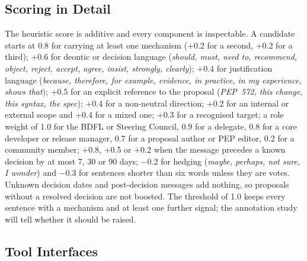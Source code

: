 \subsection{Scoring in Detail}

The heuristic score is additive and every component is inspectable. A candidate starts at 0.8 for carrying at least one mechanism (+0.2 for a second, +0.2 for a third); +0.6 for deontic or decision language (\emph{should, must, need to, recommend, object, reject, accept, agree, insist, strongly, clearly}); +0.4 for justification language (\emph{because, therefore, for example, evidence, in practice, in my experience, shows that}); +0.5 for an explicit reference to the proposal (\emph{PEP~572, this change, this syntax, the spec}); +0.4 for a non-neutral direction; +0.2 for an internal or external scope and +0.4 for a mixed one; +0.3 for a recognised target; a role weight of 1.0 for the BDFL or Steering Council, 0.9 for a delegate, 0.8 for a core developer or release manager, 0.7 for a proposal author or PEP editor, 0.2 for a community member; +0.8, +0.5 or +0.2 when the message precedes a known decision by at most 7, 30 or 90 days; $-$0.2 for hedging (\emph{maybe, perhaps, not sure, I wonder}) and $-$0.3 for sentences shorter than six words unless they are votes. Unknown decision dates and post-decision messages add nothing, so proposals without a resolved decision are not boosted. The threshold of 1.0 keeps every sentence with a mechanism and at least one further signal; the annotation study will tell whether it should be raised.

\subsection{Tool Interfaces}

